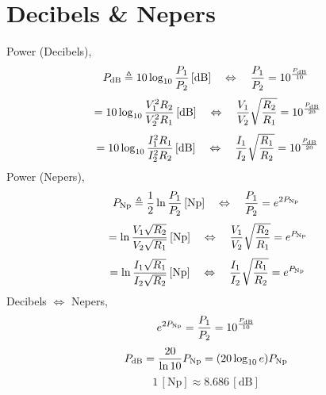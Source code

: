\documentclass[journal]{IEEEtran}%
\begin{document}
\section{Decibels \& Nepers}%
%
\noindent Power (Decibels),%
\begin{equation}
	P_\mathrm{dB}\triangleq{10}\log_{10}{P_1\over{P_2}}\,\mathrm{[dB]}
	\quad\Leftrightarrow\quad
	{P_1\over{P_2}}=10^{P_\mathrm{dB}\over{10}}
	\nonumber
\end{equation}
%
\begin{equation}
	{}=10\log_{10}{{{V^2_1}R_2}\over{{V^2_2}R_1}}\,\mathrm{[dB]}
	\quad\Leftrightarrow\quad
	{V_1\over{V_2}}\sqrt{R_2\over{R_1}}=10^{P_\mathrm{dB}\over{20}}
	\nonumber
\end{equation}
%
\begin{equation}
	{}=10\log_{10}{{{I^2_1}R_1}\over{{I^2_2}R_2}}\,\mathrm{[dB]}
	\quad\Leftrightarrow\quad
	{I_1\over{I_2}}\sqrt{R_1\over{R_2}}=10^{P_\mathrm{dB}\over{20}}
	\nonumber
\end{equation}
%
Power (Nepers),%
\begin{equation}
	P_\mathrm{Np}\triangleq{1\over{2}}\ln{P_1\over{P_2}}\,\mathrm{[Np]}
	\quad\Leftrightarrow\quad
	{P_1\over{P_2}}=e^{2P_\mathrm{Np}}
	\nonumber
\end{equation}
%
\begin{equation}
	{}=\ln{{V_1\sqrt{R_2}\over{V_2\sqrt{R_1}}}}\,\mathrm{[Np]}
	\quad\Leftrightarrow\quad
	{V_1\over{V_2}}\sqrt{R_2\over{R_1}}=e^{P_\mathrm{Np}}
	\nonumber
\end{equation}
%
\begin{equation}
	{}=\ln{{I_1\sqrt{R_1}\over{I_2\sqrt{R_2}}}}\,\mathrm{[Np]}
	\quad\Leftrightarrow\quad
	{I_1\over{I_2}}\sqrt{R_1\over{R_2}}=e^{P_\mathrm{Np}}
	\nonumber
\end{equation}
%
Decibels $\Leftrightarrow$ Nepers,%
%
\begin{equation}
	e^{2P_\mathrm{Np}}={P_1\over{P_2}}=10^{P_\mathrm{dB}\over{10}}
	\nonumber
\end{equation}
%
\begin{equation}
	P_\mathrm{dB}={20\over\ln{10}}P_\mathrm{Np}=(20\log_{10}e)P_\mathrm{Np}
	\nonumber
\end{equation}
%
\begin{equation}
	1\,\mathrm{[Np]}\approx{8.686}\,\mathrm{[dB]}
	\nonumber
\end{equation}
%
\end{document}
